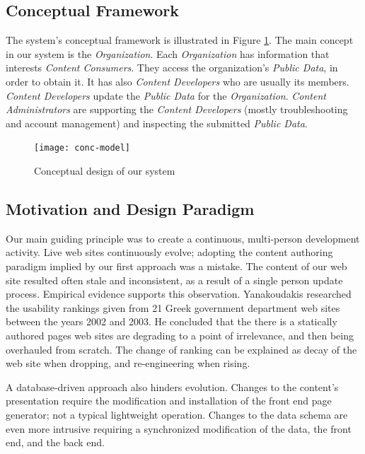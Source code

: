 \documentclass[10pt]{article}
\begin{document}
\subsection{Conceptual Framework}

The system's conceptual framework is illustrated in Figure \ref{fig:conc-model}.
The main concept in our system is the {\em Organization}. Each {\em Organization} has 
information that interests {\em Content Consumers}. They 
access the organization's {\em Public Data}, in order to obtain it.
It has also {\em Content Developers} 
who are usually its members. {\em Content Developers} update the 
{\em Public Data} for the {\em Organization}. {\em Content Administrators} 
are supporting the {\em Content Developers} 
(mostly troubleshooting and account management)
and inspecting the submitted {\em Public Data}.

\begin{figure}[h!]
\begin{center}
\texttt{[image: conc-model]}
\end{center}
\caption{Conceptual design of our system}
\label{fig:conc-model}
\end{figure}

\subsection{Motivation and Design Paradigm}
\label{sec:design}

Our main guiding principle was to create a continuous, multi-person 
development activity.
Live web sites continuously evolve;
adopting the content authoring paradigm implied
by our first approach was a mistake. The content of our web site resulted often stale and inconsistent, as a result 
of a single person update process.
Empirical evidence supports this observation.
Yanakoudakis \cite{G03} researched the usability rankings given from 21 Greek government department
web sites between the years 2002 and 2003. He concluded that 
the there is a statically authored pages web sites are degrading to
a point of irrelevance, and then being overhauled from scratch.
The change of ranking can be explained as decay of the web site when dropping,
and re-engineering when rising.

A database-driven approach also hinders evolution.
Changes to the content's presentation require the modification
and installation of the front end page generator;
not a typical lightweight operation.
Changes to the data schema are even more intrusive
requiring a synchronized modification of the data,
the front end, and the back end.
\end{document}
